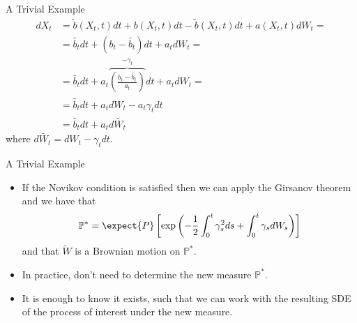 \documentclass{beamer}
\begin{document}
\begin{frame}{A Trivial Example}
  \begin{equation*}
    \begin{aligned}
      dX_t &= \tilde{b}(X_t,t) dt+b(X_t,t) dt -\tilde{b}(X_t,t) dt + a(X_t,t) dW_t = \\
      &=\tilde{b_t} dt + (b_t -\tilde{b_t})dt + a_t dW_t =\\
      &=\tilde{b_t}dt+ a_t\overbrace{\left(\frac{b_t-\tilde{b_t}}{a_t}\right)}^{-\gamma_t}dt + a_t dW_t = \\
      &= \tilde{b_t}dt+a_t dW_t - a_t\gamma_t dt\\
      &=\tilde{b_t}dt+a_t d\tilde{W_t}
    \end{aligned}
  \end{equation*}
  where $d\tilde{W_t}=dW_t-\gamma_t dt$.
\end{frame}

\begin{frame}{A Trivial Example}
  \begin{itemize}
  \item<1-> If the Novikov condition is satisfied then we can apply the Girsanov theorem and we have that
    \begin{equation}
      \mathbb{P}^* = \expect{P}\left[\exp\left(-\frac{1}{2}\int_0^t \gamma_s^2 ds + \int_0^t \gamma_s dW_s \right)\right]
    \end{equation}
    and that $\tilde{W}$ is a Brownian motion on $\mathbb{P}^*$.
  \item<2-> In practice, don't need to determine the new measure $\mathbb{P}^*$.
  \item<3-> It is enough to know it exists, such that we can work with the resulting SDE of the process of interest under the new measure.	
  \end{itemize}
\end{frame}
\end{document}
